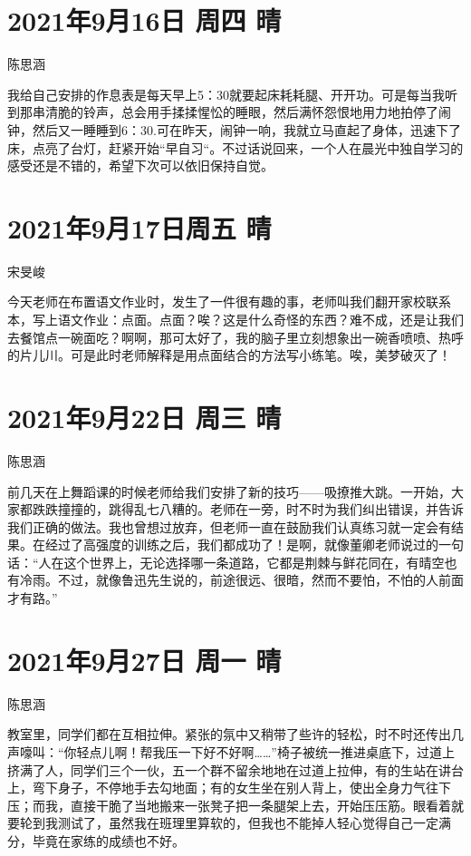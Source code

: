 \section{2021年9月16日 周四 晴}

陈思涵

我给自己安排的作息表是每天早上5：30就要起床耗耗腿、开开功。可是每当我听到那串清脆的铃声，总会用手揉揉惺忪的睡眼，然后满怀怨恨地用力地拍停了闹钟，然后又一睡睡到6：30.可在昨天，闹钟一响，我就立马直起了身体，迅速下了床，点亮了台灯，赶紧开始“早自习“。不过话说回来，一个人在晨光中独自学习的感受还是不错的，希望下次可以依旧保持自觉。

\section{2021年9月17日周五 晴}

宋旻峻

今天老师在布置语文作业时，发生了一件很有趣的事，老师叫我们翻开家校联系本，写上语文作业：点面。点面？唉？这是什么奇怪的东西？难不成，还是让我们去餐馆点一碗面吃？啊啊，那可太好了，我的脑子里立刻想象出一碗香喷喷、热呼的片儿川。可是此时老师解释是用点面结合的方法写小练笔。唉，美梦破灭了！

\section{2021年9月22日 周三 晴}

陈思涵

前几天在上舞蹈课的时候老师给我们安排了新的技巧——吸撩推大跳。一开始，大家都跌跌撞撞的，跳得乱七八糟的。老师在一旁，时不时为我们纠出错误，并告诉我们正确的做法。我也曾想过放弃，但老师一直在鼓励我们认真练习就一定会有结果。在经过了高强度的训练之后，我们都成功了！是啊，就像董卿老师说过的一句话：“人在这个世界上，无论选择哪一条道路，它都是荆棘与鲜花同在，有晴空也有冷雨。不过，就像鲁迅先生说的，前途很远、很暗，然而不要怕，不怕的人前面才有路。”

\section{2021年9月27日 周一 晴}

陈思涵

教室里，同学们都在互相拉伸。紧张的氛中又稍带了些许的轻松，时不时还传出几声嚎叫：“你轻点儿啊！帮我压一下好不好啊……”椅子被统一推进桌底下，过道上挤满了人，同学们三个一伙，五一个群不留余地地在过道上拉伸，有的生站在讲台上，弯下身子，不停地手去勾地面；有的女生坐在别人背上，使出全身力气往下压；而我，直接干脆了当地搬来一张凳子把一条腿架上去，开始压压筋。眼看着就要轮到我测试了，虽然我在班理里算软的，但我也不能掉人轻心觉得自己一定满分，毕竟在家练的成绩也不好。

